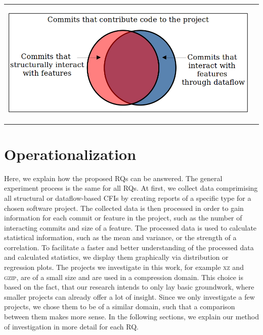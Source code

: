 \begin{center}
\begin{tabular}{cc}
\includegraphics[height=6cm]{gfx/Commits-of-a-Software-Project.png}
\end{tabular}
\end{center}

\section{Operationalization}\label{sec:operationalization}

Here, we explain how the proposed RQs can be answered.
The general experiment process is the same for all RQs.
At first, we collect data comprimising all structural or dataflow-based CFIs by creating reports of a specific type for a chosen software project.
The collected data is then processed in order to gain information for each commit or feature in the project, such as the number of interacting commits and size of a feature.
The processed data is used to calculate statistical information, such as the mean and variance, or the strength of a correlation.
To facilitate a faster and better understanding of the processed data and calculated statistics, we display them graphically via distribution or regression plots.
The projects we investigate in this work, for example \textsc{xz} and \textsc{gzip}, are of a small size and are used in a compression domain.
This choice is based on the fact, that our research intends to only lay basic groundwork, where smaller projects can already offer a lot of insight.
Since we only investigate a few projects, we chose them to be of a similar domain, such that a comparison between them makes more sense.
In the following sections, we explain our method of investigation in more detail for each RQ.

